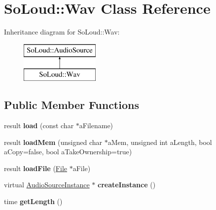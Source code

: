 \hypertarget{class_so_loud_1_1_wav}{}\section{So\+Loud\+:\+:Wav Class Reference}
\label{class_so_loud_1_1_wav}
Inheritance diagram for So\+Loud\+:\+:Wav\+:\begin{figure}[H]
\begin{center}
\leavevmode
\includegraphics[height=2.000000cm]{class_so_loud_1_1_wav}
\end{center}
\end{figure}
\subsection*{Public Member Functions}
\begin{DoxyCompactItemize}
\item 
\mbox{\label{class_so_loud_1_1_wav_aede2b2cea88eec6b9baa81dc503eeb42}} 
result {\bfseries load} (const char $\ast$a\+Filename)
\item 
\mbox{\label{class_so_loud_1_1_wav_a9844134680e0580fc9bce78aa8923a0b}} 
result {\bfseries load\+Mem} (unsigned char $\ast$a\+Mem, unsigned int a\+Length, bool a\+Copy=false, bool a\+Take\+Ownership=true)
\item 
\mbox{\label{class_so_loud_1_1_wav_a79d1999bf6b95de7f284d45fc126537f}} 
result {\bfseries load\+File} (\mbox{\hyperlink{class_so_loud_1_1_file}{File}} $\ast$a\+File)
\item 
\mbox{\label{class_so_loud_1_1_wav_aabd5ef0f446202e392d7acab433c26c6}} 
virtual \mbox{\hyperlink{class_so_loud_1_1_audio_source_instance}{Audio\+Source\+Instance}} $\ast$ {\bfseries create\+Instance} ()
\item 
\mbox{\label{class_so_loud_1_1_wav_a89b7a8b1041139e0ed8b9a81b17626ed}} 
time {\bfseries get\+Length} ()
\end{DoxyCompactItemize}
